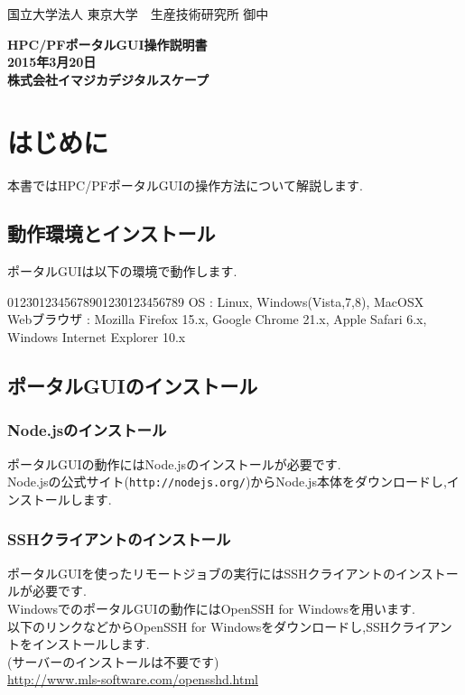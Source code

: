 \documentclass[a4paper,10pt,oneside]{jsbook}
\begin{document}
\begin{titlepage}
\noindent
国立大学法人 東京大学　生産技術研究所 御中
\begin{center}
	\vspace{8cm}
	{\Huge \textbf{HPC/PFポータルGUI操作説明書}} \\
	\vspace{10cm}
	{\Large \textbf{2015年3月20日}} \\
	\vspace{0.5cm}
	{\Large \textbf{株式会社イマジカデジタルスケープ}}
\end{center}
\end{titlepage}

\tableofcontents

\chapter{はじめに}
本書ではHPC/PFポータルGUIの操作方法について解説します.

\section{動作環境とインストール}
ポータルGUIは以下の環境で動作します.
\begin{tabbing}
0123\=01234567890123\=0123456789\kill
\> OS \> : Linux, Windows(Vista,7,8), MacOSX \\
\> Webブラウザ \> : Mozilla Firefox 15.x, Google Chrome 21.x, Apple Safari 6.x, Windows Internet Explorer 10.x 
\end{tabbing}

\section{ポータルGUIのインストール}

\subsection{Node.jsのインストール}
ポータルGUIの動作にはNode.jsのインストールが必要です.\\
Node.jsの公式サイト(\verb+http://nodejs.org/+)からNode.js本体をダウンロードし,インストールします.

\subsection{SSHクライアントのインストール}
ポータルGUIを使ったリモートジョブの実行にはSSHクライアントのインストールが必要です.\\
WindowsでのポータルGUIの動作にはOpenSSH for Windowsを用います.\\
以下のリンクなどからOpenSSH for Windowsをダウンロードし,SSHクライアントをインストールします.\\
(サーバーのインストールは不要です) \\
    \url{http://www.mls-software.com/opensshd.html}
\end{document}
